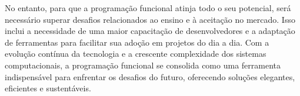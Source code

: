 No entanto, para que a programação funcional atinja todo o seu potencial, será necessário superar desafios relacionados ao ensino e à aceitação no mercado. Isso inclui a necessidade de uma maior capacitação de desenvolvedores e a adaptação de ferramentas para facilitar sua adoção em projetos do dia a dia.
Com a evolução contínua da tecnologia e a crescente complexidade dos sistemas computacionais, a programação funcional se consolida como uma ferramenta indispensável para enfrentar os desafios do futuro, oferecendo soluções elegantes, eficientes e sustentáveis.

